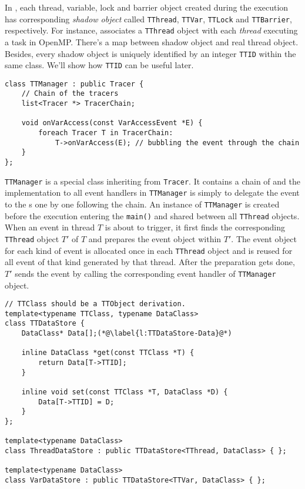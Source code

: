 In \ThreadTracer{}, each thread, variable, lock and barrier object created during the execution has corresponding \textit{shadow object} called \verb|TThread|, \verb|TTVar|, \verb|TTLock| and \verb|TTBarrier|, respectively. For instance, \ThreadTracer{} associates a \verb|TThread| object with each \textit{thread} executing a task in OpenMP. There's a map between shadow object and real thread object. Besides, every shadow object is uniquely identified by an integer \verb|TTID| within the same class. We'll show how \verb|TTID| can be useful later.

\begin{lstlisting}[caption={\texttt{TTManager} class}]
class TTManager : public Tracer {
	// Chain of the tracers
	list<Tracer *> TracerChain;
	
	void onVarAccess(const VarAccessEvent *E) {
		foreach Tracer T in TracerChain:
			T->onVarAccess(E); // bubbling the event through the chain
	}
};
\end{lstlisting}

\verb|TTManager| is a special class inheriting from \verb|Tracer|. It contains a chain of \Tracer{} and the implementation to all event handlers in \verb|TTManager| is simply to delegate the event to the \Tracer{}s one by one following the chain. An instance of \verb|TTManager| is created before the execution entering the \verb|main()| and shared between all \verb|TThread| objects. When an event in thread $T$ is about to trigger, it first finds the corresponding \verb|TThread| object $T'$ of $T$ and prepares the event object within $T'$. The event object for each kind of event is allocated once in each \verb|TThread| object and is reused for all event of that kind generated by that thread. After the preparation gets done, $T'$ sends the event by calling the corresponding event handler of \verb|TTManager| object.

\begin{lstlisting}[caption={\texttt{TTDataStore}, \texttt{ThreadDataStore} and \texttt{VarDataStore} class}]
// TTClass should be a TTObject derivation.
template<typename TTClass, typename DataClass>
class TTDataStore {
	DataClass* Data[];(*@\label{l:TTDataStore-Data}@*)
	
	inline DataClass *get(const TTClass *T) {
		return Data[T->TTID];
	}
	
 	inline void set(const TTClass *T, DataClass *D) {
		Data[T->TTID] = D;
	}
};

template<typename DataClass>
class ThreadDataStore : public TTDataStore<TThread, DataClass> { };

template<typename DataClass>
class VarDataStore : public TTDataStore<TTVar, DataClass> { };
\end{lstlisting}

